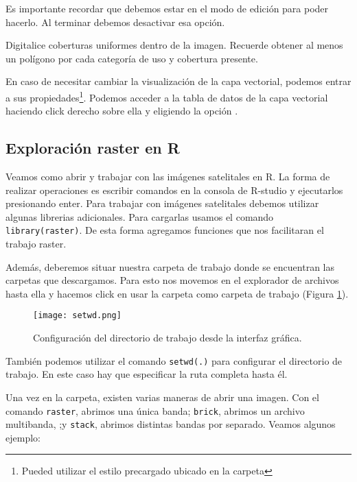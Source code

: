 Es importante recordar que debemos estar en el modo de edici\'on para poder hacerlo.
Al terminar debemos desactivar esa opci\'on.

\begin{act}
   Digitalice coberturas uniformes dentro de la imagen. Recuerde obtener al
   menos un pol\'igono por cada categor\'ia de uso y cobertura presente.
\end{act}

En caso de necesitar cambiar la visualizaci\'on de la capa vectorial, podemos entrar
a sus propiedades\footnote{Pueded utilizar el estilo precargado
ubicado en la carpeta }. Podemos acceder a la tabla de
datos de la capa vectorial haciendo click derecho sobre ella y eligiendo la
opci\'on .

\subsection{Exploraci\'on raster en R}

Veamos como abrir y trabajar con las im\'agenes satelitales en R. La forma de
realizar operaciones es escribir comandos en la consola de R-studio y
ejecutarlos presionando enter. Para trabajar con im\'agenes satelitales debemos utilizar
algunas librerias adicionales. Para cargarlas usamos el comando
\texttt{library(raster)}. De esta forma agregamos funciones que nos facilitaran
el trabajo raster.

Adem\'as, deberemos situar nuestra carpeta de trabajo donde se encuentran las
carpetas que descargamos. Para esto nos movemos en el explorador de archivos
hasta ella y hacemos click en usar la carpeta como carpeta de trabajo (Figura \ref{fig:setwd}).

\begin{figure}[h!]
\begin{center}
    \texttt{[image: setwd.png]}
\end{center}
\caption{Configuraci\'on del directorio de trabajo desde la interfaz gr\'afica.}
\label{fig:setwd}
\end{figure}

Tambi\'en podemos utilizar el comando \texttt{setwd(.)} para configurar el
directorio de trabajo. En este caso hay que especificar la ruta completa hasta
\'el.

Una vez en la carpeta, existen varias maneras de abrir una imagen. Con el comando
\texttt{raster}, abrimos una \'unica banda; \texttt{brick}, abrimos un archivo multibanda,
;y \texttt{stack}, abrimos distintas bandas por separado. Veamos algunos ejemplo:

